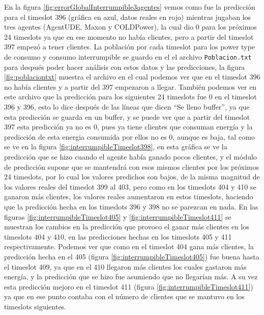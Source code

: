 En la figura \ref{fig:errorGlobalInterrumpible3agentes} vemos como fue la predicción para el timeslot 396 (gráfica en azul, datos reales en rojo) mientras jugaban los tres agentes (AgentUDE, Maxon y COLDPower), la cual dio 0 para los próximos 24 timeslots ya que en ese momento no había clientes, pero a partir del timeslot 397 empezó a tener clientes. 
La población por cada timeslot para los power type de consumo y consumo interrumpible se guardo en el el archivo \texttt{Poblacion.txt} para después poder hacer análisis con estos datos y las predicciones, la figura \ref{fig:poblaciontxt} muestra el archivo en el cual podemos ver que en el timeslot 396 no había clientes y a partir del 397 empezaron a llegar.
También podemos ver en este archivo que la predicción para los siguientes 24 timeslots fue 0 en el timeslot 396 y 396, esto lo dice después de las líneas que dicen ``Se lleno buffer'', ya que esta predicción se guarda en un buffer, y se puede ver que a partir del timeslot 397 esta predicción ya no es 0, pues ya tiene clientes que consuman energía y la predicción de esta energia consumida por ellos no es 0, aunque es baja, tal como se ve en la figura \ref{fig:interrumpibleTimeslot398}, en esta gráfica se ve la predicción que se hizo cuando el agente había ganado pocos clientes, y el módulo de predicción supone que se mantendrá con esos mismos clientes por los próximos 24 timeslots, por lo cual los valores predichos son bajos, de la misma magnitud de los valores reales del timeslot 399 al 403, pero como en los timeslots 404 y 410 se ganaron más clientes, los valores reales aumentaron en estos timeslots, haciendo que la predicción hecha en los timeslots 396 y 398 no se parezcan en nada.
En las figuras \ref{fig:interrumpibleTimeslot405} y \ref{fig:interrumpibleTimeslot411} se muestran los cambios en la predicción que provoco el ganar más clientes en los timeslots 404 y 410, en las predicciones hechas en los timeslots 405 y 411 respectivamente. 
Podemos ver que como en el timeslot 404 gana más clientes, la predicción hecha en el 405 (figura \ref{fig:interrumpibleTimeslot405}) fue buena hasta el timeslot 409, ya que en el 410 llegaron más clientes los cuales gastaron más energía, y la predicción que se hizo fue asumiendo que no llegarían más. 
A su vez esta predicción mejoro en el timeslot 411 (figura \ref{fig:interrumpibleTimeslot411}) ya que en ese punto contaba con el número de clientes que se mantuvo en los timeslots siguientes.

